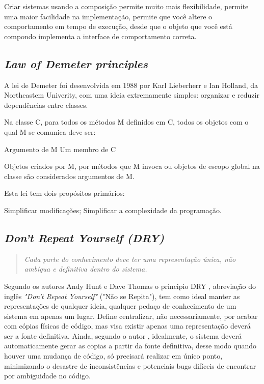 \documentclass[12pt]{article}
\begin{document}
Criar sistemas usando a composição permite muito mais flexibilidade, permite uma maior facilidade na implementação, permite que você altere o comportamento em tempo de execução, desde que o objeto que você está compondo implementa a interface de comportamento correta. 


\subsection{\textit{Law of Demeter principles}} \label{sec:law_of_demeter}

A lei de Demeter foi desenvolvida em 1988 por Karl Lieberherr e Ian Holland, da Northeastem Univerity, com uma ideia extremamente simples: organizar e reduzir dependências entre classes.

Na classe C, para todos os métodos M definidos em C, todos os objetos com o qual M se comunica deve ser:

    Argumento de M
    Um membro de C

Objetos criados por M, por métodos que M invoca ou objetos de escopo global na classe são considerados argumentos de M.

Esta lei tem dois propósitos primários:

    Simplificar modificações;
    Simplificar a complexidade da programação.


\subsection{\textit{Don't Repeat Yourself (DRY)}} \label{sec:dey}

\begin{quote}
\textit{Cada parte do conhecimento deve ter uma representação única, não ambígua e definitiva dentro do sistema.}
\end{quote}

Segundo os autores Andy Hunt e Dave Thomas \cite{KEEP_IT_DRY_SHY} o principio DRY \cite{THE_PRAGMATIC_PROGRAMMER}, abreviação do inglês \textit{"Don't Repeat Yourself"} ("Não se Repita"), tem como ideal manter as representações de qualquer ideia, qualquer pedaço de conhecimento de um sistema em apenas um lugar.
Define centralizar, não necessariamente, por acabar com cópias físicas de código, mas visa existir apenas uma representação deverá ser a fonte definitiva.
Ainda, segundo o autor \cite{KEEP_IT_DRY_SHY}, idealmente, o sistema deverá automaticamente gerar as copias a partir da fonte definitiva, desse modo quando houver uma mudança de código, só precisará realizar em único ponto, minimizando o desastre de inconsistências e potenciais bugs difíceis de encontrar por ambiguidade no código. 
\end{document}
